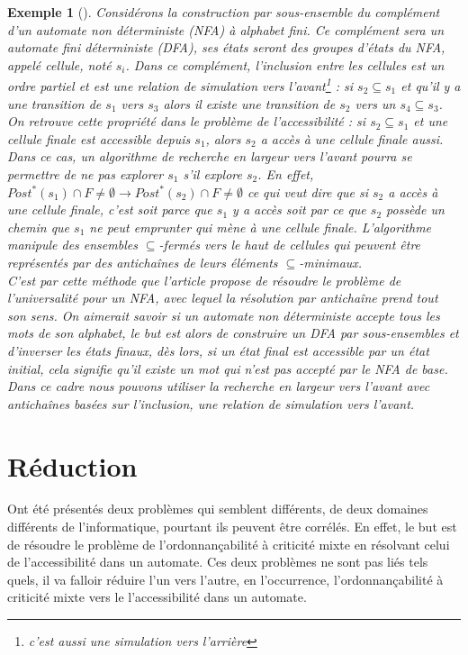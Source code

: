 \documentclass[a4paper]{report}
\theoremstyle{break}
\newtheorem{exem}{Exemple}
\begin{document}
\begin{exem}[\cite{doyen2010antichain}]
Considérons la construction par sous-ensemble du complément d'un automate non déterministe (NFA) à alphabet fini. Ce complément sera un automate fini déterministe (DFA), ses états seront des groupes d'états du NFA, appelé cellule, noté $s_i$. Dans ce complément, l'inclusion entre les cellules est un ordre partiel et est une relation de simulation vers l'avant\footnote{c'est aussi une simulation vers l'arrière} : si $s_2 \subseteq s_1$ et qu'il y a une transition de $s_1$ vers $s_3$ alors il existe une transition de $s_2$ vers un $s_4 \subseteq s_3$. On retrouve cette propriété dans le problème de l'accessibilité : si $s_2 \subseteq s_1$ et une cellule finale est accessible depuis $s_1$, alors $s_2$ a accès à une cellule finale aussi. Dans ce cas, un algorithme de recherche en largeur vers l'avant pourra se permettre de ne pas explorer $s_1$ s'il explore $s_2$. En effet, $Post^*(s_1) \cap F \neq \emptyset \rightarrow Post^*(s_2) \cap F \neq \emptyset$ ce qui veut dire que si $s_2$ a accès à une cellule finale, c'est soit parce que $s_1$ y a accès soit par ce que $s_2$ possède un chemin que $s_1$ ne peut emprunter qui mène à une cellule finale. L'algorithme manipule des ensembles $\subseteq$-fermés vers le haut de cellules qui peuvent être représentés par des antichaînes de leurs éléments $\subseteq$-minimaux.\\

C'est par cette méthode que l'article \cite{doyen2010antichain} propose de résoudre le problème de l'universalité pour un NFA, avec lequel la résolution par antichaîne prend tout son sens. On aimerait savoir si un automate non déterministe accepte tous les mots de son alphabet, le but est alors de construire un DFA par sous-ensembles et d'inverser les états finaux, dès lors, si un état final est accessible par un état initial, cela signifie qu'il existe un mot qui n'est pas accepté par le NFA de base. Dans ce cadre nous pouvons utiliser la recherche en largeur vers l’avant avec antichaînes basées sur l'inclusion, une relation de simulation vers l'avant.
\end{exem}

\section{Réduction}
Ont été présentés deux problèmes qui semblent différents, de deux domaines différents de l'informatique, pourtant ils peuvent être corrélés. En effet, le but est de résoudre le problème de l'ordonnançabilité à criticité mixte en résolvant celui de l'accessibilité dans un automate. Ces deux problèmes ne sont pas liés tels quels, il va falloir réduire l'un vers l'autre, en l'occurrence, l'ordonnançabilité à criticité mixte vers le l'accessibilité dans un automate.\\
\end{document}
